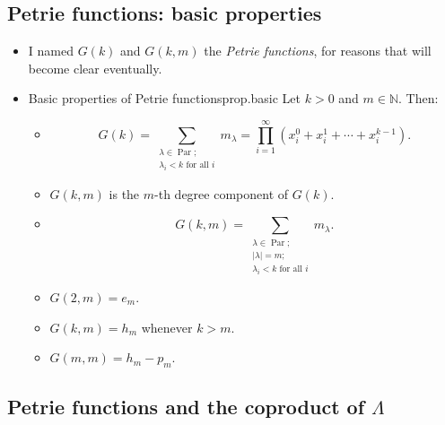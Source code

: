 \documentclass[numbers=enddot,12pt,final,onecolumn,notitlepage]{scrartcl}%
\newcommand{\defn}[1]{{\color{darkred}\emph{#1}}}
\newcommand{\0}{\phantom{c}}
\let\sumnonlimits\sum
\let\prodnonlimits\prod
\renewcommand{\sum}{\sumnonlimits\limits}
\renewcommand{\prod}{\prodnonlimits\limits}
\newcommand{\nowbox}{\hphantom{x} \vspace{-1.5pc}}
\begin{document}
\subsection{Petrie functions: basic properties}

\begin{itemize}
\item I named $G\left(  k\right)  $ and $G\left(  k,m\right)  $ the
\defn{Petrie functions}, for reasons that will become clear eventually.

\item \nowbox
\begin{proposition}{Basic properties of Petrie functions}{prop.basic}
Let $k > 0$ and $m \in \mathbb{N}$. Then:

\begin{itemize}
\item
\[
G\left(  k\right)  =\sum_{\substack{\lambda\in\operatorname*{Par}%
;\\\lambda_{i}<k\text{ for all }i}}m_{\lambda}=\prod_{i=1}^{\infty}\left(
x_{i}^{0}+x_{i}^{1}+\cdots+x_{i}^{k-1}\right)  .
\]


\item $G\left(  k,m\right)  $ is the $m$-th degree component of $G\left(
k\right)  $.

\item
\[
G\left(  k,m\right)  =\sum_{\substack{\lambda\in\operatorname*{Par}%
;\\\left\vert \lambda\right\vert =m;\\\lambda_{i}<k\text{ for all }%
i}}m_{\lambda}.
\]


\item $G\left(  2,m\right)  =e_{m}$.

\item $G\left(  k,m\right)  =h_{m}$ whenever $k>m$.

\item $G\left(  m,m\right)  =h_{m}-p_{m}$.
\end{itemize}
\end{proposition}

\end{itemize}

\subsection{Petrie functions and the coproduct of $\Lambda$}
\end{document}
